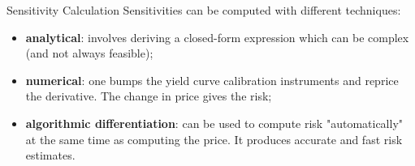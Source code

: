 \documentclass{beamer}
\begin{document}

\begin{frame}{Sensitivity Calculation}
Sensitivities can be computed with different techniques:
\begin{itemize}
	\item \textbf{analytical}: involves deriving a closed-form expression which can be complex (and not always feasible);
	\item \textbf{numerical}: one bumps the yield curve calibration instruments and reprice the derivative. The change in price gives the risk;
	\item \textbf{algorithmic differentiation}: can be used to compute risk "automatically" at the same time as computing the price. It produces accurate and fast risk estimates.
\end{itemize}
\end{frame}
\end{document}
